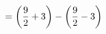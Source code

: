 \documentclass[preview]{standalone}
\begin{document}
\begin{align*}
\special{dvisvgm:raw <g id='unique000'>}&= \left(\frac{9}{2} + 3\right) - \left(\frac{9}{2} - 3\right)\special{dvisvgm:raw </g>}
\end{align*}
\end{document}
